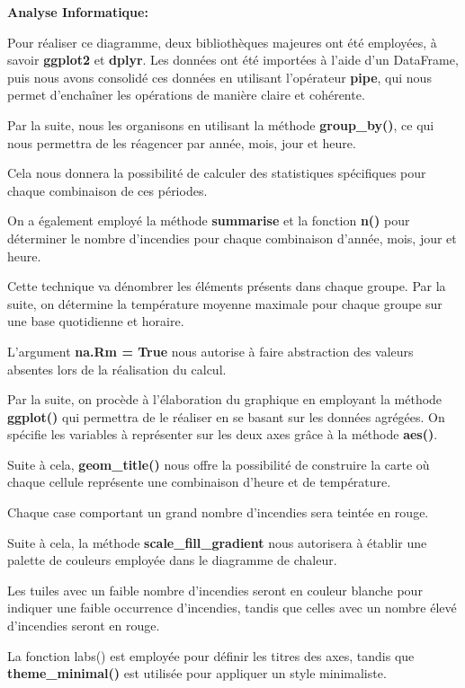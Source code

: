 \documentclass[
]{article}
\begin{document}
\textbf{Analyse Informatique:}

Pour réaliser ce diagramme, deux bibliothèques majeures ont été
employées, à savoir \textbf{ggplot2} et \textbf{dplyr}. Les données ont
été importées à l'aide d'un DataFrame, puis nous avons consolidé ces
données en utilisant l'opérateur \textbf{pipe}, qui nous permet
d'enchaîner les opérations de manière claire et cohérente.

Par la suite, nous les organisons en utilisant la méthode
\textbf{group\_by()}, ce qui nous permettra de les réagencer par année,
mois, jour et heure.

Cela nous donnera la possibilité de calculer des statistiques
spécifiques pour chaque combinaison de ces périodes.

On a également employé la méthode \textbf{summarise} et la fonction
\textbf{n()} pour déterminer le nombre d'incendies pour chaque
combinaison d'année, mois, jour et heure.

Cette technique va dénombrer les éléments présents dans chaque groupe.
Par la suite, on détermine la température moyenne maximale pour chaque
groupe sur une base quotidienne et horaire.

L'argument \textbf{na.Rm = True} nous autorise à faire abstraction des
valeurs absentes lors de la réalisation du calcul.

Par la suite, on procède à l'élaboration du graphique en employant la
méthode \textbf{ggplot()} qui permettra de le réaliser en se basant sur
les données agrégées. On spécifie les variables à représenter sur les
deux axes grâce à la méthode \textbf{aes()}.

Suite à cela, \textbf{geom\_title()} nous offre la possibilité de
construire la carte où chaque cellule représente une combinaison d'heure
et de température.

Chaque case comportant un grand nombre d'incendies sera teintée en
rouge.

Suite à cela, la méthode \textbf{scale\_fill\_gradient} nous autorisera
à établir une palette de couleurs employée dans le diagramme de chaleur.

Les tuiles avec un faible nombre d'incendies seront en couleur blanche
pour indiquer une faible occurrence d'incendies, tandis que celles avec
un nombre élevé d'incendies seront en rouge.

La fonction labs() est employée pour définir les titres des axes, tandis
que \textbf{theme\_minimal()} est utilisée pour appliquer un style
minimaliste.
\end{document}
